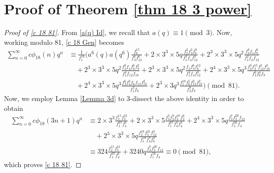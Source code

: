 \documentclass[12pt]{article}
\numberwithin{equation}{section}
\theoremstyle{plain}
\numberwithin{theorem}{section}
\theoremstyle{definition}
\theoremstyle{remark}
\begin{document}
    \section{Proof of Theorem \ref{thm 18 3 power}}
    \begin{proof}[Proof of \eqref{c 18 81}]
    From \eqref{a(q) Id}, we recall that $a(q)\equiv 1 \pmod{3}$. Now, working modulo 81, \eqref{c 18 Gen} becomes
    \begin{align*}
     \sum_{n=0}^\infty c\phi_{18}(n)q^n&\equiv \frac{1}{f_1^{18}}\Bigg( a^6(q) a(q^6)\frac{f_6^{15}}{f_3^6 f_{12}^6}+2\times 3^3 \times5 q \frac{f_2^2 f_3^3 f_6^9}{f_1^3 f_4 f_{12}^3}+2^3\times 3^3\times 5 q^2\frac{f_3^8 f_4 f_6^6}{f_1^2 f_2 f_{12}}\\
     &\quad +2^3\times 3^3\times 5 q^2\frac{f_3^8 f_4 f_6^6 f_9^2}{f_1^4 f_{12} f_{18}}+2^3\times 3^3\times 5 q^2\frac{f_2 f_3^6 f_6^{12}}{f_1^4 f_4 f_{12}^3}+2^4\times 3^3\times 5 q^3\frac{f_2^3 f_3^{15} f_{12}^2 f_{18}^2}{f_1^6 f_6^4 f_9}\\
     &\quad +2^4\times 3^3\times 5 q^3\frac{f_3^6 f_4^3 f_6 f_{12} f_{18}^2}{f_1^3 f_9}+2^3 \times3 q^3\frac{f_1^{18} f_6^5 f_{12}^2 f_{18}^2}{f_3^9 f_9}\Bigg) \pmod{81}.
    \end{align*}
    Now, we employ Lemma \ref{Lemma 3d} to 3-dissect the above identity in order to obtain
    \begin{align*}
        \sum_{n=0}^\infty c\phi_{18}(3n+1)q^n&\equiv 2\times 3^3 \frac{f_2^{15} f_3^{21}}{f_1^{67} f_4^6}+2 \times3^3\times 5\frac{f_3^3 f_2^9 f_3^{18} f_2^6}{f_1^{67} f_4^3 f_4^3}+2^4\times 3^3\times 5 q\frac{f_2^7 f_3^{20} f_{12}}{f_1^{56} f_4}\\
        &\quad+2^3\times 3^3\times 5 q\frac{f_2^{16} f_3^{21} f_{12}^3}{f_1^{59} f_4^7 f_6^3}\\
        &\equiv 324 \frac{f_2^{15} f_3^{21}}{f_1^{67} f_4^6}+ 3240 q\frac{f_2^7 f_3^{20} f_{12}}{f_1^{56} f_4}\equiv 0 \pmod{81},
    \end{align*}which proves \eqref{c 18 81}.
    \end{proof}
\end{document}
